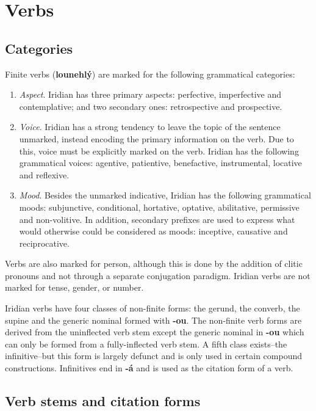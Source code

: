 \chapter{Verbs}
\section{Categories}
\par Finite verbs (\textbf{lounehlý}) are marked for the following grammatical categories:
\begin{enumerate}
	\item \textit{Aspect}. Iridian has three primary aspects: perfective, imperfective and contemplative; and two secondary ones: retrospective and prospective.
	\item \textit{Voice}. Iridian has a strong tendency to leave the topic of the sentence unmarked, instead encoding the primary information on the verb. Due to this, voice must be explicitly marked on the verb. Iridian has the following grammatical voices: agentive, patientive, benefactive, instrumental, locative and reflexive.
	\item \textit{Mood}. Besides the unmarked indicative, Iridian has the following grammatical moods: subjunctive, conditional, hortative, optative, abilitative, permissive and non-volitive. In addition, secondary prefixes are used to express what would otherwise could be considered as moods: inceptive, causative and reciprocative.
\end{enumerate}

\par Verbs are also marked for person, although this is done by the addition of clitic pronouns and not through a separate conjugation paradigm. Iridian verbs are not marked for tense, gender, or number.
\par Iridian verbs have four classes of non-finite forms: the gerund, the converb, the supine and the generic nominal formed with \textbf{-ou}. The non-finite verb forms are derived from the uninflected verb stem except the generic nominal in \textbf{-ou} which can only be formed from a fully-inflected verb stem. A fifth class exists--the infinitive--but this form is largely defunct and is only used in certain compound constructions. Infinitives end in \textbf{-á} and is used as the citation form of a verb.

\section{Verb stems and citation forms}

